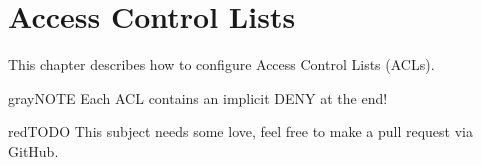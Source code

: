 \section{Access Control Lists}
This chapter describes how to configure Access Control Lists (ACLs).
\begin{textbox}{gray}{NOTE}
Each ACL contains an implicit DENY at the end!
\end{textbox}
\begin{textbox}{red}{TODO}
This subject needs some love, feel free to make a pull request via GitHub.
\end{textbox}
